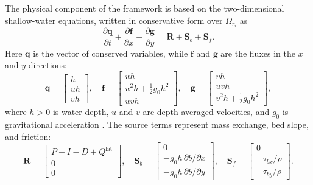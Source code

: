 \documentclass[pdflatex,sn-mathphys-ay]{sn-jnl}
\theoremstyle{thmstyleone}
\begin{document}
The physical component of the framework is based on the two-dimensional
shallow-water equations, written in conservative form over
$\Omega_{r_i}$ as
\begin{equation}
  \frac{\partial \mathbf{q}}{\partial t}
  +
  \frac{\partial \mathbf{f}}{\partial x}
  +
  \frac{\partial \mathbf{g}}{\partial y}
  =
  \mathbf{R}
  +
  \mathbf{S}_{b}
  +
  \mathbf{S}_{f}.
  \label{eq:swe_main}
\end{equation}
Here $\mathbf{q}$ is the vector of conserved variables, while
$\mathbf{f}$ and $\mathbf{g}$ are the fluxes in the $x$ and $y$
directions:
\begin{equation}
  \mathbf{q}
  =
  \begin{bmatrix}
    h \\ uh \\ vh
  \end{bmatrix},
  \quad
  \mathbf{f}
  =
  \begin{bmatrix}
    uh \\
    u^{2}h+\tfrac{1}{2}g_{0}h^{2} \\
    uvh
  \end{bmatrix},
  \quad
  \mathbf{g}
  =
  \begin{bmatrix}
    vh \\
    uvh \\
    v^{2}h+\tfrac{1}{2}g_{0}h^{2}
  \end{bmatrix},
  \label{eq:swe_fluxes}
\end{equation}
where $h>0$ is water depth, $u$ and $v$ are depth-averaged velocities,
and $g_{0}$ is gravitational acceleration
\citep{Toro2001,Bates2010,Liang2010,Bates2022}.
The source terms represent mass exchange, bed slope, and friction:
\begin{equation}
  \mathbf{R}
  =
  \begin{bmatrix}
    P-I-D+Q^{\mathrm{lat}} \\ 0 \\ 0
  \end{bmatrix},
  \quad
  \mathbf{S}_{b}
  =
  \begin{bmatrix}
    0 \\
    -g_{0}h\,\partial b/\partial x \\
    -g_{0}h\,\partial b/\partial y
  \end{bmatrix},
  \quad
  \mathbf{S}_{f}
  =
  \begin{bmatrix}
    0 \\
    -\tau_{bx}/\rho \\
    -\tau_{by}/\rho
  \end{bmatrix}.
  \label{eq:swe_sources}
\end{equation}
\end{document}

